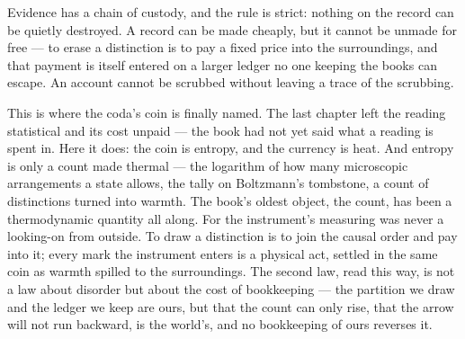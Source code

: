 %
%
%
%
%

\noindent Evidence has a chain of custody, and the rule is strict: nothing on the record can be quietly
destroyed. A record can be made cheaply, but it cannot be unmade for free --- to erase a distinction is to pay a
fixed price into the surroundings, and that payment is itself entered on a larger ledger no one keeping the
books can escape. An account cannot be scrubbed without leaving a trace of the scrubbing.

This is where the coda's coin is finally named. The last chapter left the reading statistical and its cost
unpaid --- the book had not yet said what a reading is spent in. Here it does: the coin is entropy, and the
currency is heat. And entropy is only a count made thermal --- the logarithm of how many microscopic
arrangements a state allows, the tally on Boltzmann's tombstone, a count of distinctions turned into warmth. The
book's oldest object, the count, has been a thermodynamic quantity all along. For the instrument's measuring was never a looking-on from outside. To draw a distinction is
to join the causal order and pay into it; every mark the instrument enters is a physical act, settled in the
same coin as warmth spilled to the surroundings. The second law, read this way, is not a law about disorder but
about the cost of bookkeeping --- the partition we draw and the ledger we keep are ours, but that the count can
only rise, that the arrow will not run backward, is the world's, and no bookkeeping of ours reverses it.

